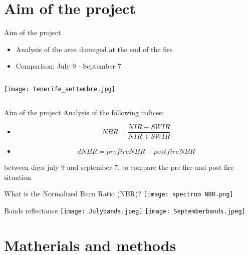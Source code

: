 \documentclass{beamer}
\begin{document}
\section{Aim of the project}

\begin{frame}{Aim of the project}
\begin{itemize}
    \item Analysis of the area damaged at the end of the fire
    \item Comparison: July 9 - September 7
\end{itemize}
\begin{column}{1\textwidth}
    \begin{center}
        \texttt{[image: Tenerife\_settembre.jpg]}
    \end{center}
\end{column}
\end{frame}

\begin{frame}{Aim of the project}
Analysis of the following indices:
\begin{itemize}
    \item \begin{equation}
NBR=\frac{NIR-SWIR}{NIR+SWIR}
    \end{equation}
    \item  \begin{equation}
dNBR=prefireNBR - postfireNBR
    \end{equation}
\end{itemize}
between days july 9 and september 7, to compare the pre fire and post fire situation
\end{frame}

\begin{frame}{What is the Normalized Burn Ratio (NBR)?}
\texttt{[image: spectrum NBR.png]}
\end{frame}

\begin{frame}{Bands reflectance}
\texttt{[image: Julybands.jpeg]}
\texttt{[image: Septemberbands.jpeg]}
\end{frame}


\section{Matherials and methods}
\end{document}
